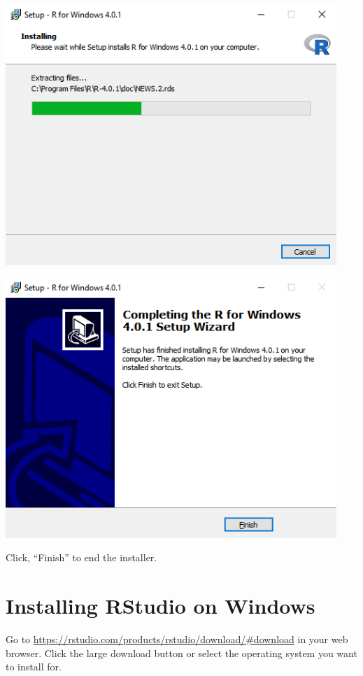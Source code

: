 \documentclass[
]{book}
\begin{document}
\includegraphics{images/05-r_11.png}

\includegraphics{images/05-r_12.png}

Click, ``Finish'' to end the installer.

\hypertarget{installing-rstudio-on-windows}{%
\section*{Installing RStudio on Windows}\label{installing-rstudio-on-windows}}

Go to \url{https://rstudio.com/products/rstudio/download/\#download} in your web browser. Click the large download button or select the operating system you want to install for.
\end{document}
